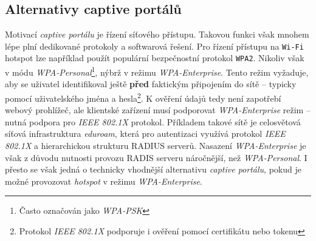 \documentclass[thesis=M,czech]{FITthesis}[2012/10/20]
\begin{document}
%

\subsection{Alternativy captive portálů}

Motivací \textit{captive portálu} je řízení síťového přístupu. Takovou funkci však mnohem lépe\cite{bakalarka-srovnani-captive-fwall-nac} plní dedikované protokoly a softwarová řešení. Pro řízení přístupu na \texttt{Wi-Fi} hotspot lze například použít populární bezpečnostní protokol \texttt{WPA2}. Nikoliv však v módu \textit{WPA-Personal}\footnote{Často označován jako \textit{WPA-PSK}}, nýbrž v režimu \textit{WPA-Enterprise}. Tento režim vyžaduje, aby se uživatel identifikoval ještě \textbf{před} faktickým připojením do sítě -- typicky pomocí uživatelského jména a hesla\footnote{Protokol \textit{IEEE 802.1X} podporuje i ověření pomocí certifikátu nebo tokenu}. K ověření údajů tedy není zapotřebí webový prohlížeč, ale klientské zařízení musí podporovat \textit{WPA-Enterprise} režim -- nutná podpora pro \textit{IEEE 802.1X} protokol. Příkladem takové sítě je celosvětová síťová infrastruktura \textit{eduroam}, která pro autentizaci využívá protokol \textit{IEEE 802.1X} a hierarchickou strukturu RADIUS serverů. Nasazení \textit{WPA-Enterprise} je však z důvodu nutnosti provozu RADIS serveru náročnější, než \textit{WPA-Personal}. I přesto se však jedná o technicky vhodnější alternativu \textit{captive portálu}, pokud je možné provozovat \textit{hotspot} v režimu \textit{WPA-Enterprise}.


\end{document}
